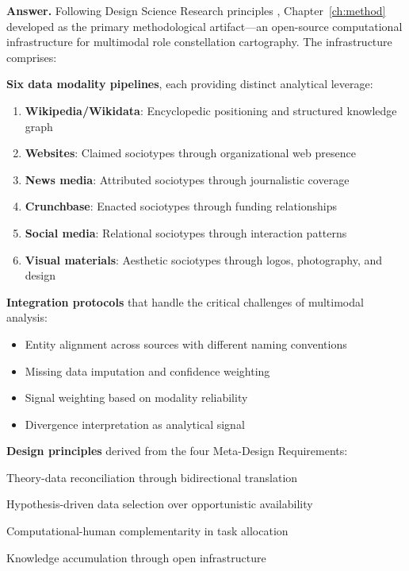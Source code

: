 \documentclass[../main.tex]{subfiles}
\begin{document}
\noindent\textbf{Answer.} Following Design Science Research principles , Chapter~\ref{ch:method} developed \RoleBox{} as the primary methodological artifact---an open-source computational infrastructure for multimodal role constellation cartography. The infrastructure comprises:

\textbf{Six data modality pipelines}, each providing distinct analytical leverage:
\begin{enumerate}[leftmargin=*, itemsep=0.2em]
\item \textbf{Wikipedia/Wikidata}: Encyclopedic positioning and structured knowledge graph
\item \textbf{Websites}: Claimed sociotypes through organizational web presence
\item \textbf{News media}: Attributed sociotypes through journalistic coverage
\item \textbf{Crunchbase}: Enacted sociotypes through funding relationships
\item \textbf{Social media}: Relational sociotypes through interaction patterns
\item \textbf{Visual materials}: Aesthetic sociotypes through logos, photography, and design
\end{enumerate}

\textbf{Integration protocols} that handle the critical challenges of multimodal analysis:
\begin{itemize}[leftmargin=*, itemsep=0.2em]
\item Entity alignment across sources with different naming conventions
\item Missing data imputation and confidence weighting
\item Signal weighting based on modality reliability
\item Divergence interpretation as analytical signal
\end{itemize}

\textbf{Design principles} derived from the four Meta-Design Requirements:
\begin{description}[leftmargin=0.5cm, itemsep=0.2em]
\item[MDR-1] Theory-data reconciliation through bidirectional translation
\item[MDR-2] Hypothesis-driven data selection over opportunistic availability
\item[MDR-3] Computational-human complementarity in task allocation
\item[MDR-4] Knowledge accumulation through open infrastructure
\end{description}
\end{document}
